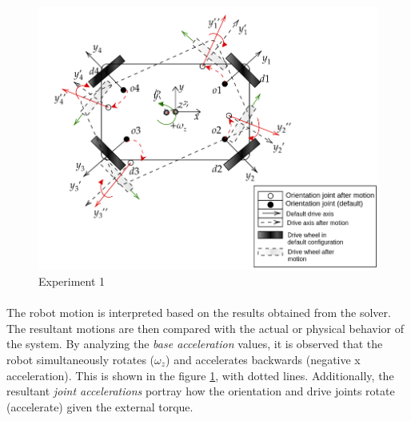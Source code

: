 \begin{figure}[h!]
	\begin{center}
		\includegraphics[scale=0.46]{images/exp1.png}
	\end{center}
	\caption{Experiment 1}
	\label{fig:exp1}
\end{figure}

\paragraph{}The robot motion is interpreted based on the results obtained from the solver. The resultant motions are then compared with the actual or physical behavior of the system. By analyzing the \textit{base acceleration} values, it is observed that the robot simultaneously rotates ($\omega_z$) and accelerates backwards (negative x acceleration). This is shown in the figure \ref{fig:exp1}, with dotted lines. Additionally, the resultant \textit{joint accelerations} portray how the orientation and drive joints rotate (accelerate) given the external torque. 

